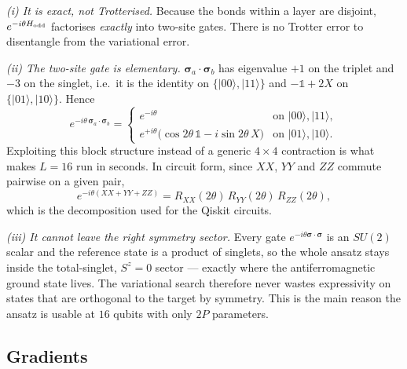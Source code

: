 \documentclass[10pt,a4paper]{article}
\newcommand{\ket}[1]{\lvert #1 \rangle}
\newcommand{\ssig}{\bm{\sigma}}
\begin{document}
\emph{(i) It is exact, not Trotterised.} Because the bonds within a layer are
disjoint, $e^{-i\theta H_{\rm odd}}$ factorises \emph{exactly} into two-site
gates. There is no Trotter error to disentangle from the variational error.

\emph{(ii) The two-site gate is elementary.} $\ssig_a\cdot\ssig_b$ has
eigenvalue $+1$ on the triplet and $-3$ on the singlet, i.e.\ it is the
identity on $\{\ket{00},\ket{11}\}$ and $-\mathbb{1}+2X$ on
$\{\ket{01},\ket{10}\}$. Hence
\begin{equation}
  e^{-i\theta\,\ssig_a\cdot\ssig_b} =
  \begin{cases}
    e^{-i\theta} & \text{on } \ket{00},\ket{11},\\[2pt]
    e^{+i\theta}\big(\cos 2\theta\,\mathbb{1} - i \sin 2\theta\, X\big)
      & \text{on } \ket{01},\ket{10}.
  \end{cases}
  \label{eq:gate}
\end{equation}
Exploiting this block structure instead of a generic $4\times4$ contraction is
what makes $L=16$ run in seconds. In circuit form, since $XX$, $YY$ and $ZZ$
commute pairwise on a given pair,
\begin{equation}
  e^{-i\theta(XX+YY+ZZ)} = R_{XX}(2\theta)\,R_{YY}(2\theta)\,R_{ZZ}(2\theta),
\end{equation}
which is the decomposition used for the Qiskit circuits.

\emph{(iii) It cannot leave the right symmetry sector.} Every gate
$e^{-i\theta\ssig\cdot\ssig}$ is an $SU(2)$ scalar and the reference state is a
product of singlets, so the whole ansatz stays inside the total-singlet,
$S^z=0$ sector --- exactly where the antiferromagnetic ground state lives.
The variational search therefore never wastes expressivity on states that are
orthogonal to the target by symmetry. This is the main reason the ansatz is
usable at $16$ qubits with only $2P$ parameters.

\subsection{Gradients}
\end{document}

